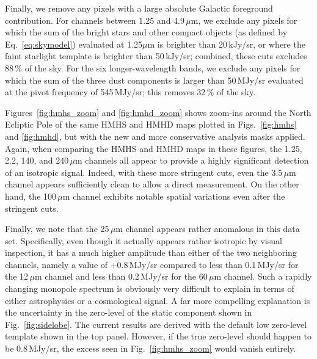 \documentclass{aa}
\begin{document}
Finally, we remove any pixels with a large absolute Galactic
foreground contribution. For channels between 1.25 and
4.9\,$\mu\mathrm{m}$, we exclude any pixels for which the sum of the
bright stars and other compact objects (as defined by
Eq.~\ref{eq:skymodel}) evaluated at 1.25$\mu\mathrm{m}$ is brighter
than 20\,kJy/sr, or where the faint starlight template is brighter
than 50\,kJy/sr; combined, these cuts excludes 88\,\% of the sky. For
the six longer-wavelength bands, we exclude any pixels for which the
sum of the three dust components is larger than 50\,MJy/sr evaluated
at the pivot frequency of 545\,MJy/sr; this removes 32\,\% of the sky.


Figures~\ref{fig:hmhs_zoom} and \ref{fig:hmhd_zoom} shows zoom-ins
around the North Ecliptic Pole of the same HMHS and HMHD maps plotted
in Figs.~\ref{fig:hmhs} and \ref{fig:hmhd}, but with the new and more
conservative analysis masks applied. Again, when comparing the HMHS
and HMHD maps in these figures, the 1.25, 2.2, 140, and
240$\,\mu\mathrm{m}$ channels all appear to provide a highly
significant detection of an isotropic signal. Indeed, with these more
stringent cuts, even the 3.5$\,\mu\mathrm{m}$ channel appears
sufficiently clean to allow a direct measurement. On the other hand,
the 100$\,\mu\mathrm{m}$ channel exhibits notable spatial variations
even after the stringent cuts.

Finally, we note that the 25\,$\mu\mathrm{m}$ channel appears rather
anomalous in this data set. Specifically, even though it actually
appears rather isotropic by visual inspection, it has a much higher
amplitude than either of the two neighboring channels, namely a value
of +0.8\,MJy/sr compared to less than 0.1\,MJy/sr for the
12$\,\mu\mathrm{m}$ channel and less than 0.2\,MJy/sr for the
60$\,\mu\mathrm{m}$ channel. Such a rapidly changing monopole spectrum is
obviously very difficult to explain in terms of either astrophysics or
a cosmological signal. A far more compelling explanation is the
uncertainty in the zero-level of the static component shown in
Fig.~\ref{fig:sidelobe}. The current results are derived with the
default low zero-level template shown in the top panel. However, if
the true zero-level should happen to be 0.8\,MJy/sr, the excess seen
in Fig.~\ref{fig:hmhs_zoom} would vanish entirely.
\end{document}
